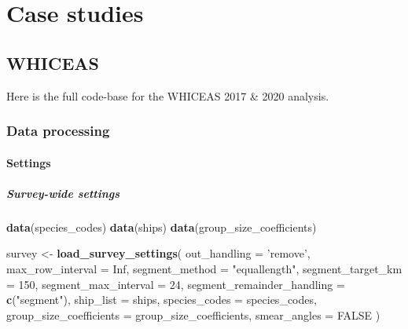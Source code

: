 \documentclass[
]{book}
\newenvironment{Shaded}{\begin{snugshade}}{\end{snugshade}}
\newcommand{\DataTypeTok}[1]{\textcolor[rgb]{0.13,0.29,0.53}{#1}}
\newcommand{\DecValTok}[1]{\textcolor[rgb]{0.00,0.00,0.81}{#1}}
\newcommand{\KeywordTok}[1]{\textcolor[rgb]{0.13,0.29,0.53}{\textbf{#1}}}
\newcommand{\NormalTok}[1]{#1}
\newcommand{\OtherTok}[1]{\textcolor[rgb]{0.56,0.35,0.01}{#1}}
\newcommand{\StringTok}[1]{\textcolor[rgb]{0.31,0.60,0.02}{#1}}
\begin{document}
\hypertarget{part-case-studies}{%
\part{Case studies}\label{part-case-studies}}

\hypertarget{whiceas}{%
\chapter{WHICEAS}\label{whiceas}}

Here is the full code-base for the WHICEAS 2017 \& 2020 analysis.

\hypertarget{data-processing}{%
\section*{Data processing}\label{data-processing}}

\hypertarget{settings-1}{%
\subsection*{Settings}\label{settings-1}}

\hypertarget{survey-wide-settings-2}{%
\subsubsection*{Survey-wide settings}\label{survey-wide-settings-2}}

\begin{Shaded}
\begin{Highlighting}[]
\KeywordTok{data}\NormalTok{(species_codes)}
\KeywordTok{data}\NormalTok{(ships)}
\KeywordTok{data}\NormalTok{(group_size_coefficients)}

\NormalTok{survey <-}\StringTok{ }\KeywordTok{load_survey_settings}\NormalTok{(}
  \DataTypeTok{out_handling =} \StringTok{'remove'}\NormalTok{,}
  \DataTypeTok{max_row_interval =} \OtherTok{Inf}\NormalTok{,}
  \DataTypeTok{segment_method =} \StringTok{"equallength"}\NormalTok{,}
  \DataTypeTok{segment_target_km =} \DecValTok{150}\NormalTok{,}
  \DataTypeTok{segment_max_interval =} \DecValTok{24}\NormalTok{,}
  \DataTypeTok{segment_remainder_handling =} \KeywordTok{c}\NormalTok{(}\StringTok{"segment"}\NormalTok{),}
  \DataTypeTok{ship_list =}\NormalTok{ ships,}
  \DataTypeTok{species_codes =}\NormalTok{ species_codes,}
  \DataTypeTok{group_size_coefficients =}\NormalTok{ group_size_coefficients,}
  \DataTypeTok{smear_angles =} \OtherTok{FALSE}
\NormalTok{)}
\end{Highlighting}
\end{Shaded}
\end{document}

